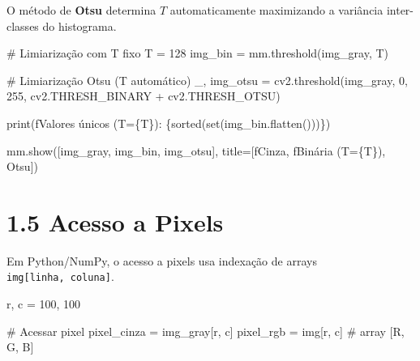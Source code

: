 \documentclass[
  portuguese,
  letterpaper,
  openany,
  oneside,
  12pt,
  a4paper]{book}
\newenvironment{Shaded}{\begin{snugshade}}{\end{snugshade}}
\newcommand{\BuiltInTok}[1]{\textcolor[rgb]{0.00,0.23,0.31}{#1}}
\newcommand{\CommentTok}[1]{\textcolor[rgb]{0.37,0.37,0.37}{#1}}
\newcommand{\DecValTok}[1]{\textcolor[rgb]{0.68,0.00,0.00}{#1}}
\newcommand{\NormalTok}[1]{\textcolor[rgb]{0.00,0.23,0.31}{#1}}
\newcommand{\OperatorTok}[1]{\textcolor[rgb]{0.37,0.37,0.37}{#1}}
\newcommand{\SpecialCharTok}[1]{\textcolor[rgb]{0.37,0.37,0.37}{#1}}
\newcommand{\SpecialStringTok}[1]{\textcolor[rgb]{0.13,0.47,0.30}{#1}}
\newcommand{\StringTok}[1]{\textcolor[rgb]{0.13,0.47,0.30}{#1}}
\begin{document}
\begin{tcolorbox}
O método de \textbf{Otsu} \autocite{otsu1979} determina \(T\)
automaticamente maximizando a variância inter-classes do histograma.

\begin{Shaded}
\begin{Highlighting}[]
\CommentTok{\# Limiarização com T fixo}
\NormalTok{T }\OperatorTok{=} \DecValTok{128}
\NormalTok{img\_bin }\OperatorTok{=}\NormalTok{ mm.threshold(img\_gray, T)}

\CommentTok{\# Limiarização Otsu (T automático)}
\NormalTok{\_, img\_otsu }\OperatorTok{=}\NormalTok{ cv2.threshold(img\_gray, }\DecValTok{0}\NormalTok{, }\DecValTok{255}\NormalTok{,}
\NormalTok{                             cv2.THRESH\_BINARY }\OperatorTok{+}\NormalTok{ cv2.THRESH\_OTSU)}

\BuiltInTok{print}\NormalTok{(}\SpecialStringTok{f\textquotesingle{}Valores únicos (T=}\SpecialCharTok{\{}\NormalTok{T}\SpecialCharTok{\}}\SpecialStringTok{): }\SpecialCharTok{\{}\BuiltInTok{sorted}\NormalTok{(}\BuiltInTok{set}\NormalTok{(img\_bin.flatten()))}\SpecialCharTok{\}}\SpecialStringTok{\textquotesingle{}}\NormalTok{)}

\NormalTok{mm.show([img\_gray, img\_bin, img\_otsu],}
\NormalTok{        title}\OperatorTok{=}\NormalTok{[}\SpecialStringTok{f\textquotesingle{}Cinza\textquotesingle{}}\NormalTok{, }\SpecialStringTok{f\textquotesingle{}Binária (T=}\SpecialCharTok{\{}\NormalTok{T}\SpecialCharTok{\}}\SpecialStringTok{)\textquotesingle{}}\NormalTok{, }\StringTok{\textquotesingle{}Otsu\textquotesingle{}}\NormalTok{])}
\end{Highlighting}
\end{Shaded}

\section{1.5 Acesso a Pixels}\label{acesso-a-pixels-2}

Em Python/NumPy, o acesso a pixels usa indexação de arrays
\texttt{img{[}linha,\ coluna{]}}.

\begin{Shaded}
\begin{Highlighting}[]
\NormalTok{r, c }\OperatorTok{=} \DecValTok{100}\NormalTok{, }\DecValTok{100}

\CommentTok{\# Acessar pixel}
\NormalTok{pixel\_cinza }\OperatorTok{=}\NormalTok{ img\_gray[r, c]}
\NormalTok{pixel\_rgb   }\OperatorTok{=}\NormalTok{ img[r, c]       }\CommentTok{\# array [R, G, B]}


\end{Highlighting}
\end{Shaded}
\end{tcolorbox}
\end{document}
